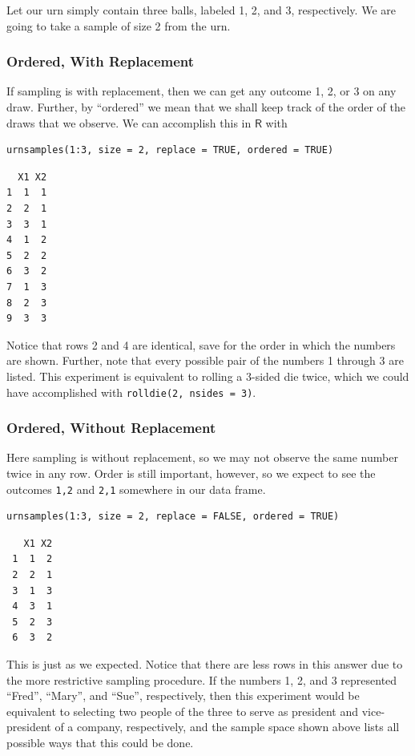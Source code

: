 \documentclass[captions=tableheading]{scrbook}
\begin{document}
\begin{example}
Let our urn simply contain three balls, labeled 1, 2, and 3, respectively. We are going to take a sample of size 2 from the urn. 
\subsubsection{Ordered, With Replacement}
\label{sec-4-1-2-2}


If sampling is with replacement, then we can get any outcome 1, 2, or 3 on any draw. Further, by ``ordered'' we mean that we shall keep track of the order of the draws that we observe. We can accomplish this in \(\mathsf{R}\) with


\lstset{language=R}
\begin{lstlisting}
urnsamples(1:3, size = 2, replace = TRUE, ordered = TRUE)
\end{lstlisting}


\begin{verbatim}
  X1 X2
1  1  1
2  2  1
3  3  1
4  1  2
5  2  2
6  3  2
7  1  3
8  2  3
9  3  3
\end{verbatim}

Notice that rows 2 and 4 are identical, save for the order in which the numbers are shown. Further, note that every possible pair of the numbers 1 through 3 are listed. This experiment is equivalent to rolling a 3-sided die twice, which we could have accomplished with \texttt{rolldie(2, nsides = 3)}.
\subsubsection{Ordered, Without Replacement}
\label{sec-4-1-2-3}


Here sampling is without replacement, so we may not observe the same number twice in any row. Order is still important, however, so we expect to see the outcomes \texttt{1,2} and \texttt{2,1} somewhere in our data frame. 


\lstset{language=R}
\begin{lstlisting}
urnsamples(1:3, size = 2, replace = FALSE, ordered = TRUE)
\end{lstlisting}

\begin{verbatim}
   X1 X2
 1  1  2
 2  2  1
 3  1  3
 4  3  1
 5  2  3
 6  3  2
\end{verbatim}

This is just as we expected. Notice that there are less rows in this answer due to the more restrictive sampling procedure. If the numbers 1, 2, and 3 represented ``Fred'', ``Mary'', and ``Sue'', respectively, then this experiment would be equivalent to selecting two people of the three to serve as president and vice-president of a company, respectively, and the sample space shown above lists all possible ways that this could be done.

\end{example}
\end{document}
